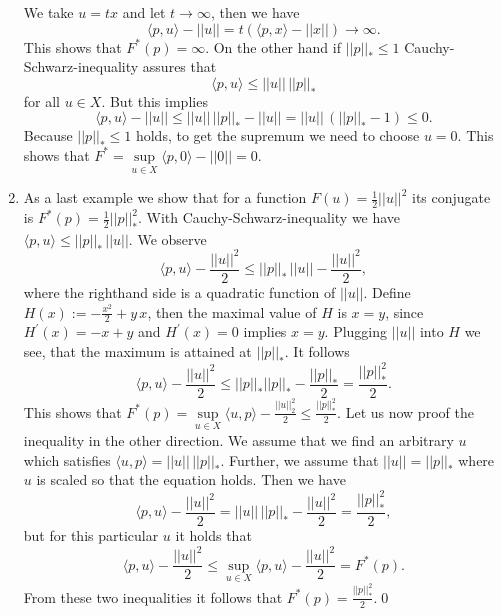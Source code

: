 \begin{example}
\begin{enumerate}
            We take $u = tx$ and let $t \longrightarrow \infty$, then we have
                $$
                    \langle p, u \rangle - ||u|| = t(\langle p, x \rangle - ||x||) \longrightarrow \infty.
                $$
            This shows that $F^{\ast}(p) = \infty$. On the other hand if $||p||_{\ast} \le 1$ Cauchy-Schwarz-inequality assures that
                $$
                    \langle p, u \rangle \le ||u|| \, ||p||_{\ast}
                $$
            for all $u \in X$. But this implies
                $$
                    \langle p, u \rangle - ||u|| \le ||u|| \, ||p||_{\ast} - ||u|| = ||u|| \, (||p||_{\ast} - 1) \le 0.
                $$
            Because $||p||_{\ast} \le 1$ holds, to get the supremum we need to choose $u = 0$. This shows that $F^{\ast} = \sup\limits_{u \in X} \langle p, 0 \rangle - ||0|| = 0$.
            \item As a last example we show that for a function $F(u) = \frac{1}{2} ||u||^{2}$ its conjugate is $F^{\ast}(p) = \frac{1}{2} ||p||_{\ast}^{2}$. With Cauchy-Schwarz-inequality we have $\langle p, u \rangle \le ||p||_{\ast}\,||u||$. We observe
                $$
                    \langle p, u \rangle - \frac{||u||^{2}}{2} \le ||p||_{\ast}\,||u|| - \frac{||u||^{2}}{2},
                $$
            where the righthand side is a quadratic function of $||u||$. Define $H(x) := -\frac{x^{2}}{2} + y\,x$, then the maximal value of $H$ is $x = y$, since $H^{'}(x) = -x + y$ and $H^{'}(x) = 0$ implies $x = y$. Plugging $||u||$ into $H$ we see, that the maximum is attained at $||p||_{\ast}$. It follows
                $$
                    \langle p, u \rangle - \frac{||u||^{2}}{2} \le ||p||_{\ast} ||p||_{\ast} - \frac{||p||_{\ast}}{2} = \frac{||p||_{\ast}^{2}}{2}.
                $$
            This shows that $F^{\ast}(p) = \sup\limits_{u \in X} \langle u, p \rangle - \frac{||u||_{2}^{2}}{2} \le \frac{||p||_{\ast}^{2}}{2}$. Let us now proof the inequality in the other direction. We assume that we find an arbitrary $u$ which satisfies $\langle u, p \rangle = ||u||\,||p||_{\ast}$. Further, we assume that $||u|| = ||p||_{\ast}$ where $u$ is scaled so that the equation holds. Then we have
                $$
                    \langle p, u \rangle - \frac{||u||^{2}}{2} = ||u||\,||p||_{\ast} - \frac{||u||^{2}}{2} = \frac{||p||^{2}_{\ast}}{2},
                $$
            but for this particular $u$ it holds that
                $$
                    \langle p, u \rangle - \frac{||u||^{2}}{2} \le \sup\limits_{u \in X} \langle p, u \rangle - \frac{||u||^{2}}{2} = F^{\ast}(p).
                $$
            From these two inequalities it follows that $F^{\ast}(p) = \frac{||p||_{\ast}^{2}}{2}$.\qed
        \end{enumerate}
    \end{example}

